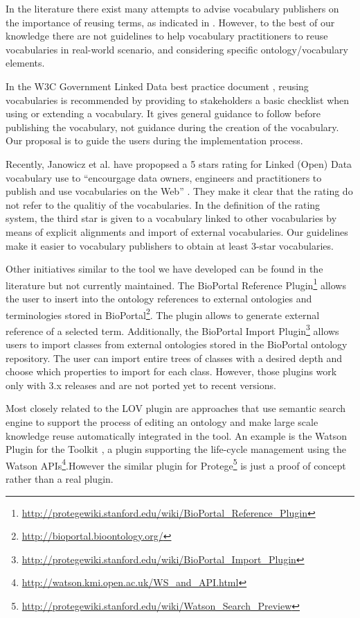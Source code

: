 In the literature there exist many attempts to advise vocabulary publishers on the importance of reusing terms, as indicated in \cite{janowicz2014five,jimenez2008}. However, to the best of our knowledge there are not guidelines to help vocabulary practitioners to reuse vocabularies in real-world scenario, and considering specific ontology/vocabulary elements. 

In the W3C Government Linked Data best practice document \cite{hyland14}, reusing vocabularies is recommended by providing to stakeholders a basic checklist when using or extending a vocabulary. It gives general guidance to follow before publishing the vocabulary, not guidance during the creation of the vocabulary. Our proposal is to guide the users during the implementation process.

Recently, Janowicz et al. have propopsed a 5 stars rating for Linked (Open) Data vocabulary use to ``encourgage data owners, engineers and practitioners to publish and use vocabularies on the Web'' \cite{janowicz2014five}. They make it clear that the rating do not refer to the qualitiy of the vocabularies. In the definition of the rating system, the third star is given to a vocabulary linked to other vocabularies by means of explicit alignments and import of external vocabularies. Our guidelines make it easier to vocabulary publishers to obtain at least 3-star vocabularies.

Other initiatives similar to the tool we have developed can be found in the literature but not currently maintained. The BioPortal Reference Plugin\footnote{\url{http://protegewiki.stanford.edu/wiki/BioPortal_Reference_Plugin}} allows the user to insert into the ontology references to external ontologies and terminologies stored in BioPortal\footnote{\url{http://bioportal.bioontology.org/}}. The plugin allows to generate external reference of a selected term. Additionally, the BioPortal Import Plugin\footnote{\url{http://protegewiki.stanford.edu/wiki/BioPortal_Import_Plugin}} allows users to import classes from external ontologies stored in the BioPortal ontology repository. The user can import entire trees of classes with a desired depth and choose which properties to import for each class. However, those plugins work only with \protege 3.x releases and are not ported yet to recent versions. 

Most closely related to the {\protege}LOV plugin are approaches that use semantic search engine to support the process of editing an ontology and make large scale knowledge reuse automatically integrated in the tool. An example is the Watson Plugin \cite{neonguide2008} for the \neon Toolkit \cite{haase2008neon}, a plugin supporting the \neon life-cycle management using the Watson \cite{d2007watson} APIs\footnote{\url{http://watson.kmi.open.ac.uk/WS_and_API.html}}.However the similar plugin for Protege\footnote{\url{http://protegewiki.stanford.edu/wiki/Watson_Search_Preview}} is just a proof of concept rather than a real plugin.

 
